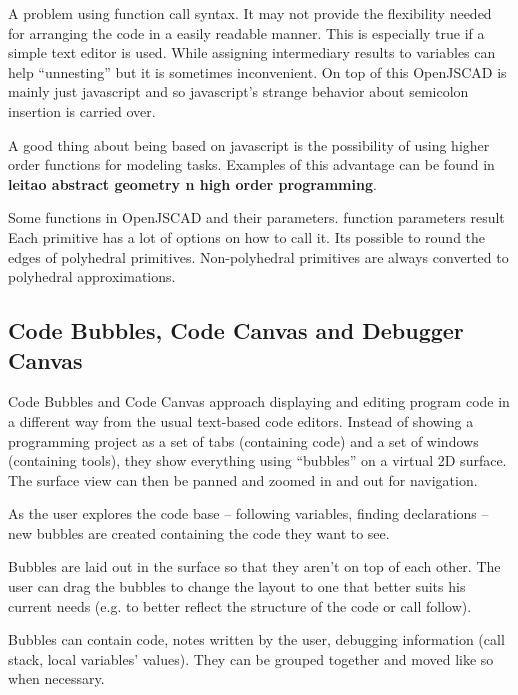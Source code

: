 \documentclass{./llncs2e/llncs}
\begin{document}
	A problem using function call syntax.
	It may not provide the flexibility needed for arranging the code in a easily readable manner. 
	This is especially true if a simple text editor is used. 
	While assigning intermediary results to variables can help ``unnesting'' but it is sometimes inconvenient. 
	On top of this OpenJSCAD is mainly just javascript and so javascript's strange behavior about semicolon insertion is carried over. 

	A good thing about being based on javascript is the possibility of using higher order functions for modeling tasks.
	Examples of this advantage can be found in \textbf{leitao abstract geometry n high order programming}.

	Some functions in OpenJSCAD and their parameters.
	function parameters result 
	Each primitive has a lot of options on how to call it.
	Its possible to round the edges of polyhedral primitives.
	Non-polyhedral primitives are always converted to polyhedral approximations.



\subsection{Code Bubbles, Code Canvas and Debugger Canvas}
	Code Bubbles and Code Canvas approach displaying and editing program code in a different way from the usual text-based code editors.
	Instead of showing a programming project as a set of tabs (containing code) and a set of windows (containing tools), they show everything using ``bubbles'' on a virtual 2D surface. 
	The surface view can then be panned and zoomed in and out for navigation.

	As the user explores the code base -- following variables, finding declarations -- new bubbles are created containing the code they want to see.

	Bubbles are laid out in the surface so that they aren't on top of each other. 
	The user can drag the bubbles to change the layout to one that better suits his current needs (e.g. to better reflect the structure of the code or call follow).

	Bubbles can contain code, notes written by the user, debugging information (call stack, local variables' values). 
	They can be grouped together and moved like so when necessary.
\end{document}
